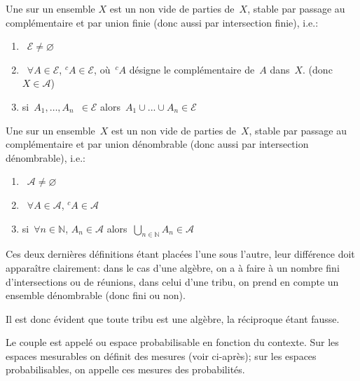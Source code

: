 \medskip
\begin{definition}[Algèbre]
Une  sur un ensemble $X$ est un  non vide de parties de~$X$, stable par passage au complémentaire et par union finie (donc aussi par intersection finie), i.e.:
\begin{enumerate}
 \item~$\mathcal{E} \not=\varnothing$
 \item~$\forall A \in \mathcal{E}$, ${}^c A \in\mathcal{E}$, où~${}^cA$ désigne le complémentaire de~$A$ dans~$X$.
	(donc~$X\in \mathcal{A}$)
\item si~$A_1,\ldots,A_n$~$\in\mathcal{E}$ alors~$A_1\cup ...\cup A_n \in\mathcal{E}$
\end{enumerate}
\end{definition}

\medskip
\begin{definition}[Tribu]\label{Def-tribu}
Une  sur un ensemble~$X$ est un  non vide de parties de~$X$, stable par passage au complémentaire et par union dénombrable (donc aussi par intersection dénombrable), i.e.:
\begin{enumerate}
 \item~$\mathcal{A} \not=\varnothing$
 \item~$\forall A \in \mathcal{A}$, ${}^c A \in\mathcal{A}$%
\item si~$\forall n \in \mathbb{N}$, $A_n \in\mathcal{A}$ alors~$\bigcup_{n\in\mathbb{N}} A_n \in\mathcal{A}$
\end{enumerate}
\end{definition}
\medskipvm
Ces deux dernières définitions étant placées l'une sous l'autre, leur différence doit apparaître clairement: dans le cas d'une algèbre, on a à faire à un nombre fini d'intersections ou de réunions, dans celui d'une tribu, on prend en compte un ensemble dénombrable (donc fini ou non).

\medskip
Il est donc évident que toute tribu est une algèbre, la réciproque étant fausse.

\medskip
\begin{definition}
Le couple  est appelé  ou espace probabilisable en fonction du contexte.
Sur les espaces mesurables on définit des mesures (voir ci-après); sur les espaces probabilisables, on appelle ces mesures des probabilités.
\end{definition}

